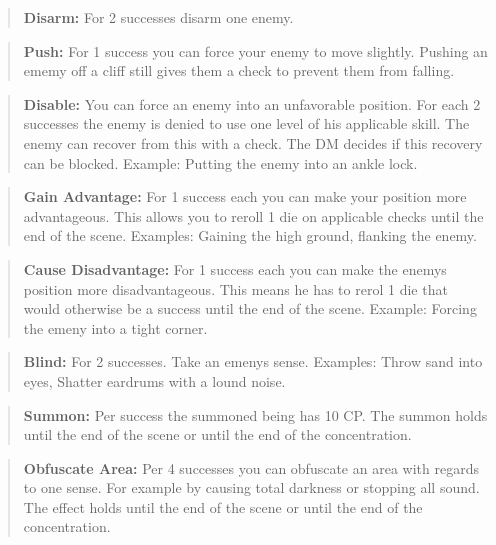 \documentclass[11pt]{article}
\begin{document}
{\begin{multicols}{2}[]
\begin{quote}
\textbf{Disarm:} For 2 successes disarm one enemy.
\end{quote}

\begin{quote}
\textbf{Push:} For 1 success you can force your enemy to move slightly. Pushing an ememy off a cliff still gives them a check to prevent them from falling.
\end{quote}

\begin{quote}
\textbf{Disable:} You can force an enemy into an unfavorable position. For each 2 successes the enemy is denied to use one level of his applicable skill. The enemy can recover from this with a check. The DM decides if this recovery can be blocked. Example: Putting the enemy into an ankle lock.
\end{quote}

\begin{quote}
\textbf{Gain Advantage:} For 1 success each you can make your position more advantageous. This allows you to reroll 1 die on applicable checks until the end of the scene. Examples: Gaining the high ground, flanking the enemy.
\end{quote}

\begin{quote}
\textbf{Cause Disadvantage:} For 1 success each you can make the enemys position more disadvantageous. This means he has to rerol 1 die that would otherwise be a success until the end of the scene. Example: Forcing the emeny into a tight corner. 
\end{quote}

\begin{quote}
\textbf{Blind:} For 2 successes. Take an emenys sense. Examples: Throw sand into eyes, Shatter eardrums with a lound noise.
\end{quote}

\begin{quote}
\textbf{Summon:} Per success the summoned being has 10 CP. The summon holds until the end of the scene or until the end of the concentration.
\end{quote}

\begin{quote}
\textbf{Obfuscate Area:} Per 4 successes you can obfuscate an area with regards to one sense. For example by causing total darkness or stopping all sound. The effect holds until the end of the scene or until the end of the concentration.
\end{quote}


\end{multicols}}
\end{document}
